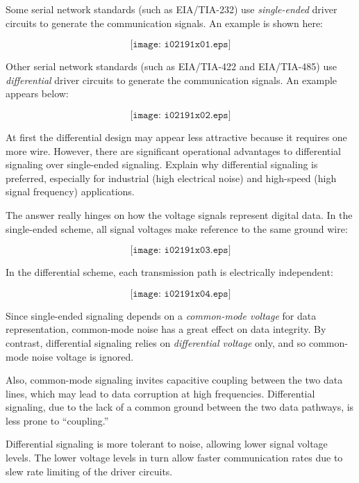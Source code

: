 

Some serial network standards (such as EIA/TIA-232) use {\it single-ended} driver circuits to generate the communication signals.  An example is shown here:

$$\texttt{[image: i02191x01.eps]}$$

Other serial network standards (such as EIA/TIA-422 and EIA/TIA-485) use {\it differential} driver circuits to generate the communication signals.  An example appears below:

$$\texttt{[image: i02191x02.eps]}$$

At first the differential design may appear less attractive because it requires one more wire.  However, there are significant operational advantages to differential signaling over single-ended signaling.  Explain why differential signaling is preferred, especially for industrial (high electrical noise) and high-speed (high signal frequency) applications.







The answer really hinges on how the voltage signals represent digital data.  In the single-ended scheme, all signal voltages make reference to the same ground wire:

$$\texttt{[image: i02191x03.eps]}$$

\vskip 10pt

In the differential scheme, each transmission path is electrically independent:

$$\texttt{[image: i02191x04.eps]}$$

\vskip 10pt

Since single-ended signaling depends on a {\it common-mode voltage} for data representation, common-mode noise has a great effect on data integrity.  By contrast, differential signaling relies on {\it differential voltage} only, and so common-mode noise voltage is ignored.  

Also, common-mode signaling invites capacitive coupling between the two data lines, which may lead to data corruption at high frequencies.  Differential signaling, due to the lack of a common ground between the two data pathways, is less prone to ``coupling.''

\vskip 10pt

Differential signaling is more tolerant to noise, allowing lower signal voltage levels.  The lower voltage levels in turn allow faster communication rates due to slew rate limiting of the driver circuits.











